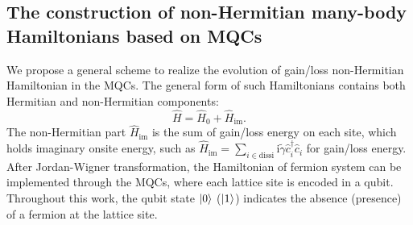 \documentclass[longbibliography, aps, prx, amsmath, amssymb, amsfonts, twocolumn,superscriptaddress, footinbib]{revtex4-1}
\begin{document}

	\subsection*{The construction of non-Hermitian many-body Hamiltonians based on MQCs~\label{sec:scheme_method}}

	We propose a general scheme to realize the evolution of gain/loss non-Hermitian Hamiltonian in the MQCs.
	The general form of such Hamiltonians contains both Hermitian and non-Hermitian components:
	\begin{equation}
		\hat{H} = \hat{H}_0 +\hat{H}_{\text{im}}. \label{eq:non-hermitian}
	\end{equation}
	The non-Hermitian part $\hat{H}_{\text{im}}$ is the sum of gain/loss energy on each site, which holds imaginary onsite energy, such as $\hat{H}_{\text{im}} = \sum_{i\in \text{dissi}} \mathrm{i}\tilde{\gamma} \hat{c}_i^{\dagger} \hat{c}_i$ for gain/loss energy. 
	After Jordan-Wigner transformation, the Hamiltonian of fermion system can be implemented through the MQCs, where each lattice site is encoded in a qubit. 
	Throughout this work, the qubit state $\ket{0}$ ($\ket{1}$) indicates the absence (presence) of a fermion at the lattice site.
\end{document}
